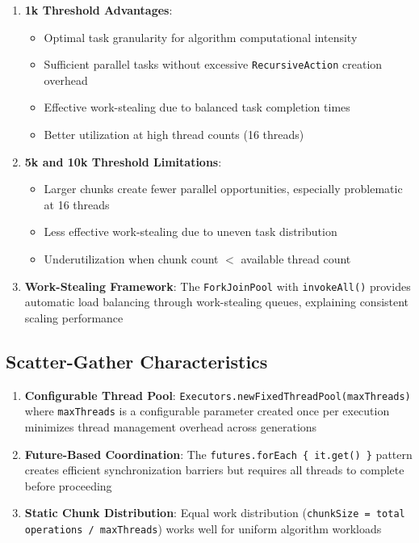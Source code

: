 \begin{enumerate}
   \item \textbf{1k Threshold Advantages}:
      \begin{itemize}
      \item Optimal task granularity for algorithm computational intensity
      \item Sufficient parallel tasks without excessive \texttt{RecursiveAction}
      creation overhead
      \item Effective work-stealing due to balanced task completion times
      \item Better utilization at high thread counts (16 threads)
      \end{itemize}

   \item \textbf{5k and 10k Threshold Limitations}:
      \begin{itemize}
      \item Larger chunks create fewer parallel opportunities, especially
      problematic at 16 threads
      \item Less effective work-stealing due to uneven task distribution
      \item Underutilization when chunk count $<$ available thread count
      \end{itemize}

   \item \textbf{Work-Stealing Framework}: The \texttt{ForkJoinPool} with
   \texttt{invokeAll()} provides automatic load balancing through work-stealing
   queues, explaining consistent scaling performance
\end{enumerate}

\subsection{Scatter-Gather Characteristics}

\begin{enumerate}
   \item \textbf{Configurable Thread Pool}:
   \texttt{Executors.newFixedThreadPool(maxThreads)} where \texttt{maxThreads}
   is a configurable parameter created once per execution minimizes thread
   management overhead across generations
   \item \textbf{Future-Based Coordination}: The \texttt{futures.forEach \{
   it.get() \}} pattern creates efficient synchronization barriers but requires
   all threads to complete before proceeding
   \item \textbf{Static Chunk Distribution}: Equal work distribution
   (\texttt{chunkSize = total operations / maxThreads}) works well for uniform
   algorithm workloads
\end{enumerate}

